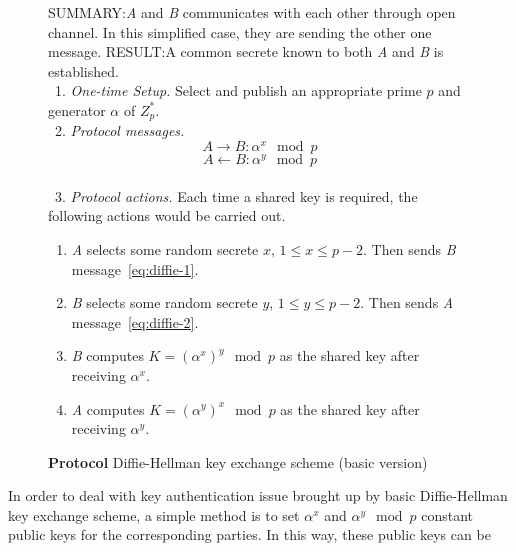 \documentclass[12pt,journal,compsoc]{IEEEtran}
\begin{document}
\begin{figure}[!htbp]
  \centering
  \begin{algorithmic}
    \STATE SUMMARY:\@ \emph{A} and \emph{B} communicates with each other
    through open channel. In this simplified case, they are sending
    the other one message.
    \STATE RESULT:\@ A common secrete known to both \emph{A} and
    \emph{B} is established.\\
    \STATE~\quad{}1. \emph{One-time Setup.} Select and publish an
    appropriate prime $p$ and generator $\alpha$ of $Z^{*}_{p}$.\\
    \STATE~\quad{}2. \emph{Protocol messages.}
    \begin{equation}
      \label{eq:diffie-1}
      A \rightarrow B: \alpha^{x}\mod p 
    \end{equation}
    \begin{equation}
      \label{eq:diffie-2}
      A \leftarrow B: \alpha^{y}\mod p
    \end{equation}\\
    \STATE~\quad{}3. \emph{Protocol actions.} Each time a shared key
    is required, the following actions would be carried out.
    \begin{enumerate}
    \item \emph{A} selects some random secrete $x$, $1\leq x\leq
      p-2$. Then sends \emph{B} message~\eqref{eq:diffie-1}.
    \item \emph{B} selects some random secrete $y$, $1\leq y\leq
      p-2$. Then sends \emph{A} message~\eqref{eq:diffie-2}.
    \item \emph{B} computes $K={(\alpha^{x})}^{y}\mod p$ as the shared
      key after receiving $\alpha^{x}$.
    \item \emph{A} computes $K={(\alpha^{y})}^{x}\mod p$ as the shared
      key after receiving $\alpha^{y}$.
    \end{enumerate}
  \end{algorithmic}
  \caption{\textbf{Protocol} Diffie-Hellman key exchange scheme (basic
    version)}
  \label{fig:diffie-key-agreement}
\end{figure}
\par
In order to deal with key authentication issue brought up by basic
Diffie-Hellman key exchange scheme, a simple method is to set
$\alpha^{x}$ and $\alpha^{y}\mod p$ constant public keys for the
corresponding parties. In this way, these public keys can be
\end{document}
